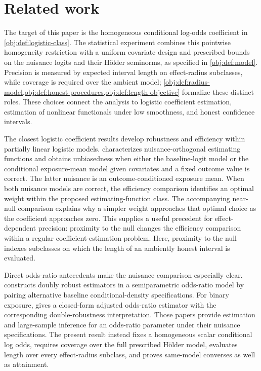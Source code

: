 \section{Related work}

The target of this paper is the homogeneous conditional log-odds coefficient  in \cref{obj:def:logistic-class}. The statistical experiment combines this pointwise homogeneity restriction with a uniform covariate design and prescribed bounds on the nuisance logits and their Hölder seminorms, as specified in \cref{obj:def:model}. Precision is measured by expected interval length on effect-radius subclasses, while coverage is required over the ambient model; \cref{obj:def:radius-model,obj:def:honest-procedures,obj:def:length-objective} formalize these distinct roles. These choices connect the analysis to logistic coefficient estimation, estimation of nonlinear functionals under low smoothness, and honest confidence intervals.

The closest logistic coefficient results develop robustness and efficiency within partially linear logistic models. \citet[Propositions 1--3]{Tan2019LogisticDR} characterizes nuisance-orthogonal estimating functions and obtains unbiasedness when either the baseline-logit model or the conditional exposure-mean model given covariates and a fixed outcome value is correct. The latter nuisance is an outcome-conditioned exposure mean. When both nuisance models are correct, the efficiency comparison identifies an optimal weight within the proposed estimating-function class. The accompanying near-null comparison explains why a simpler weight approaches that optimal choice as the coefficient approaches zero. This supplies a useful precedent for effect-dependent precision: proximity to the null changes the efficiency comparison within a regular coefficient-estimation problem. Here, proximity to the null indexes subclasses on which the length of an ambiently honest interval is evaluated.

Direct odds-ratio antecedents make the nuisance comparison especially clear. \citet{TchetgenTchetgen2010} constructs doubly robust estimators in a semiparametric odds-ratio model by pairing alternative baseline conditional-density specifications. For binary exposure, \citet{TchetgenTchetgen2013} gives a closed-form adjusted odds-ratio estimator with the corresponding double-robustness interpretation. Those papers provide estimation and large-sample inference for an odds-ratio parameter under their nuisance specifications. The present result instead fixes a homogeneous scalar conditional log odds, requires coverage over the full prescribed Hölder model, evaluates length over every effect-radius subclass, and proves same-model converses as well as attainment.

